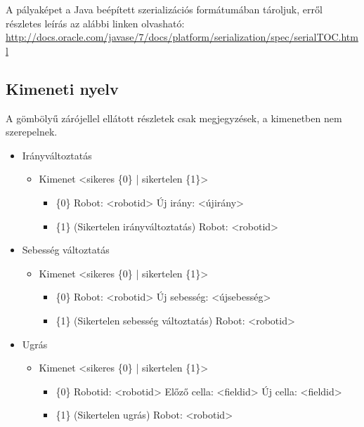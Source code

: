 \noindent A pályaképet a Java beépített szerializációs formátumában tároljuk, erről részletes leírás az alábbi linken olvasható:\\
\url{http://docs.oracle.com/javase/7/docs/platform/serialization/spec/serialTOC.html}

\subsection{Kimeneti nyelv}

A gömbölyű zárójellel ellátott részletek csak megjegyzések, a kimenetben nem szerepelnek. \newline

\begin{itemize}
	\item Irányváltoztatás
	\begin{itemize}
		\item Kimenet <sikeres \{0\} | sikertelen \{1\}>
		\begin{itemize}
				\item \{0\} Robot: <robotid> Új irány: <újirány>
				\item \{1\} (Sikertelen irányváltoztatás) Robot: <robotid>
		\end{itemize}
	\end{itemize}
	
	\item Sebesség változtatás
	\begin{itemize}
		\item Kimenet <sikeres \{0\} | sikertelen \{1\}>
		\begin{itemize}
			\item \{0\} Robot: <robotid> Új sebesség: <újsebesség>
			\item \{1\} (Sikertelen sebesség változtatás) Robot: <robotid>
		\end{itemize}
	\end{itemize}
	
	\item Ugrás
	\begin{itemize}
		\item Kimenet <sikeres \{0\} | sikertelen \{1\}>
		\begin{itemize}
			\item \{0\} Robotid: <robotid> Előző cella: <fieldid> Új cella: <fieldid>
			\item \{1\} (Sikertelen ugrás) Robot: <robotid>
		\end{itemize}
	\end{itemize}
	

\end{itemize}
